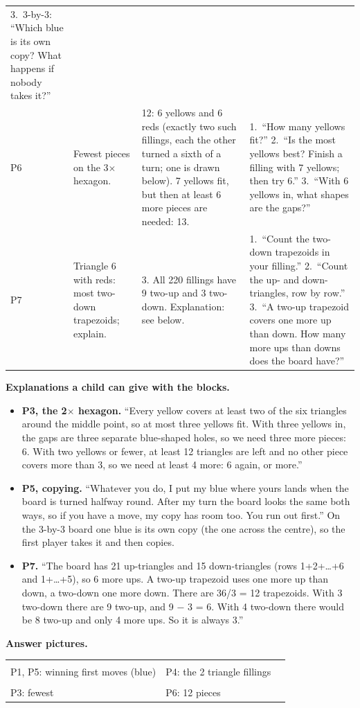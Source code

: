 \documentclass[10pt]{article}
\newcommand{\more}{\newline{\footnotesize further}}
\newcommand{\pic}[1]{}
\begin{document}
{\begin{xltabular}{\linewidth}{L{0.42in} L{1.45in} Y Y}
3.~3-by-3: ``Which blue is its own copy? What happens if nobody takes it?''\\
P6\more & Fewest pieces on the 3$\times$ hexagon. &
12: 6 yellows and 6 reds (exactly two such fillings, each the other turned a sixth of a turn; one is drawn below). 7 yellows fit, but then at least 6 more pieces are needed: 13. &
1.~``How many yellows fit?''
2.~``Is the most yellows best? Finish a filling with 7 yellows; then try 6.''
3.~``With 6 yellows in, what shapes are the gaps?''\\
P7\more & Triangle 6 with reds: most two-down trapezoids; explain. &
3. All 220 fillings have 9 two-up and 3 two-down. Explanation: see below. &
1.~``Count the two-down trapezoids in your filling.''
2.~``Count the up- and down-triangles, row by row.''
3.~``A two-up trapezoid covers one more up than down. How many more ups than downs does the board have?''\\
\bottomrule
\end{xltabular}
}

\textbf{Explanations a child can give with the blocks.}
\begin{itemize}
\item \textbf{P3, the 2$\times$ hexagon.} ``Every yellow covers at least two of the six triangles around the middle point, so at most three yellows fit. With three yellows in, the gaps are three separate blue-shaped holes, so we need three more pieces: 6. With two yellows or fewer, at least 12 triangles are left and no other piece covers more than 3, so we need at least 4 more: 6 again, or more.''
\item \textbf{P5, copying.} ``Whatever you do, I put my blue where yours lands when the board is turned halfway round. After my turn the board looks the same both ways, so if you have a move, my copy has room too. You run out first.'' On the 3-by-3 board one blue is its own copy (the one across the centre), so the first player takes it and then copies.
\item \textbf{P7.} ``The board has 21 up-triangles and 15 down-triangles (rows 1+2+\dots+6 and 1+\dots+5), so 6 more ups. A two-up trapezoid uses one more up than down, a two-down one more down. There are 36/3 = 12 trapezoids. With 3 two-down there are 9 two-up, and 9 $-$ 3 = 6. With 4 two-down there would be 8 two-up and only 4 more ups. So it is always 3.''
\end{itemize}


\needspace{2.6in}
\textbf{Answer pictures.}\par\smallskip
\begin{tabular}{@{}l@{\hspace{0.35in}}l@{\hspace{0.35in}}l@{}}
\pic{firstM} & \pic{m4tri} & \\[1pt]
{\footnotesize P1, P5: winning first moves (blue)} & {\footnotesize P4: the 2 triangle fillings} & \\[6pt]
\pic{m3ans} & \pic{bighexans} & \\[1pt]
{\footnotesize P3: fewest} & {\footnotesize P6: 12 pieces} & \\
\end{tabular}
\end{document}
